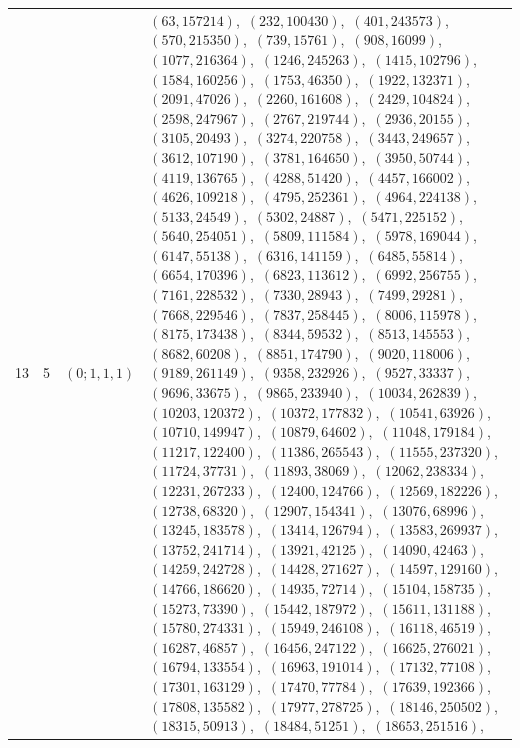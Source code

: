 \documentclass[11pt]{article}
\begin{document}
\begin{longtable}{@{}rrl>{\raggedright\arraybackslash}p{}@{}}
13 & 5 & $(0;1,1,1)$ & $(63,157214)$,\allowbreak\ $(232,100430)$,\allowbreak\ $(401,243573)$,\allowbreak\ $(570,215350)$,\allowbreak\ $(739,15761)$,\allowbreak\ $(908,16099)$,\allowbreak\ $(1077,216364)$,\allowbreak\ $(1246,245263)$,\allowbreak\ $(1415,102796)$,\allowbreak\ $(1584,160256)$,\allowbreak\ $(1753,46350)$,\allowbreak\ $(1922,132371)$,\allowbreak\ $(2091,47026)$,\allowbreak\ $(2260,161608)$,\allowbreak\ $(2429,104824)$,\allowbreak\ $(2598,247967)$,\allowbreak\ $(2767,219744)$,\allowbreak\ $(2936,20155)$,\allowbreak\ $(3105,20493)$,\allowbreak\ $(3274,220758)$,\allowbreak\ $(3443,249657)$,\allowbreak\ $(3612,107190)$,\allowbreak\ $(3781,164650)$,\allowbreak\ $(3950,50744)$,\allowbreak\ $(4119,136765)$,\allowbreak\ $(4288,51420)$,\allowbreak\ $(4457,166002)$,\allowbreak\ $(4626,109218)$,\allowbreak\ $(4795,252361)$,\allowbreak\ $(4964,224138)$,\allowbreak\ $(5133,24549)$,\allowbreak\ $(5302,24887)$,\allowbreak\ $(5471,225152)$,\allowbreak\ $(5640,254051)$,\allowbreak\ $(5809,111584)$,\allowbreak\ $(5978,169044)$,\allowbreak\ $(6147,55138)$,\allowbreak\ $(6316,141159)$,\allowbreak\ $(6485,55814)$,\allowbreak\ $(6654,170396)$,\allowbreak\ $(6823,113612)$,\allowbreak\ $(6992,256755)$,\allowbreak\ $(7161,228532)$,\allowbreak\ $(7330,28943)$,\allowbreak\ $(7499,29281)$,\allowbreak\ $(7668,229546)$,\allowbreak\ $(7837,258445)$,\allowbreak\ $(8006,115978)$,\allowbreak\ $(8175,173438)$,\allowbreak\ $(8344,59532)$,\allowbreak\ $(8513,145553)$,\allowbreak\ $(8682,60208)$,\allowbreak\ $(8851,174790)$,\allowbreak\ $(9020,118006)$,\allowbreak\ $(9189,261149)$,\allowbreak\ $(9358,232926)$,\allowbreak\ $(9527,33337)$,\allowbreak\ $(9696,33675)$,\allowbreak\ $(9865,233940)$,\allowbreak\ $(10034,262839)$,\allowbreak\ $(10203,120372)$,\allowbreak\ $(10372,177832)$,\allowbreak\ $(10541,63926)$,\allowbreak\ $(10710,149947)$,\allowbreak\ $(10879,64602)$,\allowbreak\ $(11048,179184)$,\allowbreak\ $(11217,122400)$,\allowbreak\ $(11386,265543)$,\allowbreak\ $(11555,237320)$,\allowbreak\ $(11724,37731)$,\allowbreak\ $(11893,38069)$,\allowbreak\ $(12062,238334)$,\allowbreak\ $(12231,267233)$,\allowbreak\ $(12400,124766)$,\allowbreak\ $(12569,182226)$,\allowbreak\ $(12738,68320)$,\allowbreak\ $(12907,154341)$,\allowbreak\ $(13076,68996)$,\allowbreak\ $(13245,183578)$,\allowbreak\ $(13414,126794)$,\allowbreak\ $(13583,269937)$,\allowbreak\ $(13752,241714)$,\allowbreak\ $(13921,42125)$,\allowbreak\ $(14090,42463)$,\allowbreak\ $(14259,242728)$,\allowbreak\ $(14428,271627)$,\allowbreak\ $(14597,129160)$,\allowbreak\ $(14766,186620)$,\allowbreak\ $(14935,72714)$,\allowbreak\ $(15104,158735)$,\allowbreak\ $(15273,73390)$,\allowbreak\ $(15442,187972)$,\allowbreak\ $(15611,131188)$,\allowbreak\ $(15780,274331)$,\allowbreak\ $(15949,246108)$,\allowbreak\ $(16118,46519)$,\allowbreak\ $(16287,46857)$,\allowbreak\ $(16456,247122)$,\allowbreak\ $(16625,276021)$,\allowbreak\ $(16794,133554)$,\allowbreak\ $(16963,191014)$,\allowbreak\ $(17132,77108)$,\allowbreak\ $(17301,163129)$,\allowbreak\ $(17470,77784)$,\allowbreak\ $(17639,192366)$,\allowbreak\ $(17808,135582)$,\allowbreak\ $(17977,278725)$,\allowbreak\ $(18146,250502)$,\allowbreak\ $(18315,50913)$,\allowbreak\ $(18484,51251)$,\allowbreak\ $(18653,251516)$,\allowbreak\ 
\end{longtable}
\end{document}
